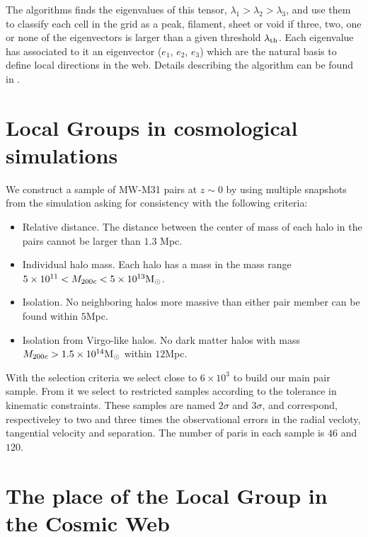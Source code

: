 \documentclass{iau}
\newcommand{\Msun}{{\ifmmode{{\rm {M_{\odot}}}}\else{${\rm{M_{\odot}}}$}\fi}}
\begin{document}
The algorithms finds the eigenvalues of this tensor, 
$\lambda_1>\lambda_2>\lambda_3$, and use them to classify each cell in
the grid as a peak, filament, sheet or void if three, two, one or none
of the eigenvectors is larger than a given threshold $\lambda_{\rm
  th}$. Each eigenvalue has associated to it an eigenvector ($e_{1}$,
$e_{2}$, $e_{3}$) which are the natural basis to define local
directions in the web. Details describing the algorithm can be found
in \cite[Forero-Romero et al. (2009)]{Tweb}.




\section{Local Groups in cosmological simulations}
We construct a sample of MW-M31 pairs at $z\sim 0$ by using multiple
snapshots from the simulation asking for consistency with the
following criteria:

\begin{itemize}
\item Relative distance. The distance between the center of mass of
  each halo in the pairs cannot be larger than $1.3$ Mpc.
\item Individual halo mass. Each halo has a mass in the mass range
  $5\times 10^{11}<M_{200c}<5\times 10^{13}\Msun$.  
\item  Isolation. No neighboring halos more massive than either pair
member can be found within $5$Mpc.
\item Isolation from Virgo-like halos. No dark matter halos with mass
  $M_{200c}>1.5\times 10^{14}\Msun$ within $12$Mpc.
\end{itemize}

With the selection criteria we select close to $6\times 10^3$ to build
our main pair sample. From it we select to restricted samples
according to the tolerance in kinematic constraints. These samples 
are named $2\sigma$ and $3\sigma$, and correspond, respectiveley to
two and three times the observational errors in the radial vecloty,
tangential velocity and separation. The number of paris in each sample
is $46$ and $120$. 


\section{The place of the Local Group in the Cosmic Web}
\end{document}

